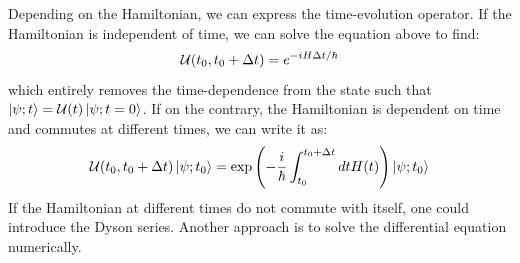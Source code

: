Depending on the Hamiltonian, we can express the time-evolution operator. If the Hamiltonian is independent of time, we can solve the equation above to find:
\begin{equation}
    \mathcal{U}(t_0, t_0 + \Delta t) = e^{-iH\Delta t/\hbar}
\end{equation}
which entirely removes the time-dependence from the state such that $\ket{\psi; t} = \mathcal{U}(t)\ket{\psi; t = 0}$. If on the contrary, the Hamiltonian is dependent on time and commutes at different times, we can write it as:
\begin{equation}
    \mathcal{U}(t_0, t_0 + \Delta t)\ket{\psi; t_0} = \exp\left(-\frac{i}{\hbar}\int_{t_0}^{t_0 + \Delta t} dt H(t)\right)\ket{\psi; t_0}
\end{equation}
If the Hamiltonian at different times do not commute with itself, one could introduce the Dyson series\cite{sakurai_modern_2021}. Another approach is to solve the differential equation numerically.

